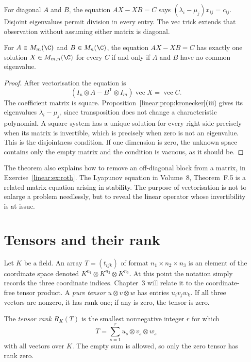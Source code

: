 For diagonal $A$ and $B$, the equation $AX-XB=C$ says $(\lambda_i-\mu_j)x_{ij}=c_{ij}$. Disjoint eigenvalues permit division in every entry. The vec trick extends that observation without assuming either matrix is diagonal.

\begin{theorem}\label{linear:thm:sylvester}
For $A\in M_m(\C)$ and $B\in M_n(\C)$, the equation $AX-XB=C$ has exactly one solution $X\in M_{m,n}(\C)$ for every $C$ if and only if $A$ and $B$ have no common eigenvalue.
\end{theorem}
\begin{proof}
After vectorisation the equation is
\[
(I_n\otimes A-B^{\mathsf T}\otimes I_m)\operatorname{vec}X=\operatorname{vec}C.
\]
The coefficient matrix is square. Proposition~\ref{linear:prop:kronecker}(iii) gives its eigenvalues $\lambda_i-\mu_j$, since transposition does not change a characteristic polynomial. A square system has a unique solution for every right side precisely when its matrix is invertible, which is precisely when zero is not an eigenvalue. This is the disjointness condition. If one dimension is zero, the unknown space contains only the empty matrix and the condition is vacuous, as it should be.
\end{proof}

The theorem also explains how to remove an off-diagonal block from a matrix, in Exercise~\ref{linear:ex:roth}. The Lyapunov equation in Volume~8, Theorem~F.5 is a related matrix equation arising in stability. The purpose of vectorisation is not to enlarge a problem needlessly, but to reveal the linear operator whose invertibility is at issue.

\section{Tensors and their rank}

Let $K$ be a field. An array $T=(t_{ijk})$ of format $n_1\times n_2\times n_3$ is an element of the coordinate space denoted $K^{n_1}\otimes K^{n_2}\otimes K^{n_3}$. At this point the notation simply records the three coordinate indices. Chapter~3 will relate it to the coordinate-free tensor product. A \emph{pure tensor} $u\otimes v\otimes w$ has entries $u_iv_jw_k$. If all three vectors are nonzero, it has rank one; if any is zero, the tensor is zero.

\begin{definition}\label{linear:def:tensorrank}
The \emph{tensor rank} $R_K(T)$ is the smallest nonnegative integer $r$ for which
\[
T=\sum_{s=1}^r u_s\otimes v_s\otimes w_s
\]
with all vectors over $K$. The empty sum is allowed, so only the zero tensor has rank zero.
\end{definition}

